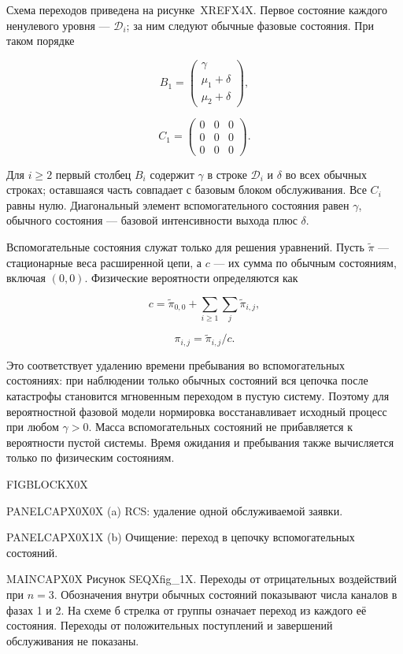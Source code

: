 Схема переходов приведена на рисунке~XREFX4X. Первое состояние каждого ненулевого уровня --- \(\mathcal{D}_i\); за ним следуют обычные фазовые состояния. При таком порядке


\[B_1=\begin{pmatrix}\gamma\\\mu_1+\delta\\\mu_2+\delta\end{pmatrix},\]

\[C_1=\begin{pmatrix}0&0&0\\0&0&0\\0&0&0\end{pmatrix}.\]


Для \(i\ge2\) первый столбец \(B_i\) содержит \(\gamma\) в строке \(\mathcal{D}_i\) и \(\delta\) во всех обычных строках; оставшаяся часть совпадает с базовым блоком обслуживания. Все \(C_i\) равны нулю. Диагональный элемент вспомогательного состояния равен \(\gamma\), обычного состояния --- базовой интенсивности выхода плюс \(\delta\).

Вспомогательные состояния служат только для решения уравнений. Пусть \(\widetilde\pi\) --- стационарные веса расширенной цепи, а \(c\) --- их сумма по обычным состояниям, включая \((0,0)\). Физические вероятности определяются как


\[c=\widetilde\pi_{0,0}+\sum_{i\ge1}\sum_j\widetilde\pi_{i,j},\]

\[\pi_{i,j}=\widetilde\pi_{i,j}/c.\]


Это соответствует удалению времени пребывания во вспомогательных состояниях: при наблюдении только обычных состояний вся цепочка после катастрофы становится мгновенным переходом в пустую систему. Поэтому для вероятностной фазовой модели нормировка восстанавливает исходный процесс при любом \(\gamma>0\). Масса вспомогательных состояний не прибавляется к вероятности пустой системы. Время ожидания и пребывания также вычисляется только по физическим состояниям. 

\noindent FIGBLOCKX0X\par

\noindent PANELCAPX0X0X (a) RCS: удаление одной обслуживаемой заявки.\par

\noindent PANELCAPX0X1X (b) Очищение: переход в цепочку вспомогательных состояний.\par

\noindent MAINCAPX0X Рисунок SEQXfig_1X. Переходы от отрицательных воздействий при \(n=3\). Обозначения внутри обычных состояний показывают числа каналов в фазах 1 и 2. На схеме б стрелка от группы означает переход из каждого её состояния. Переходы от положительных поступлений и завершений обслуживания не показаны.\par



